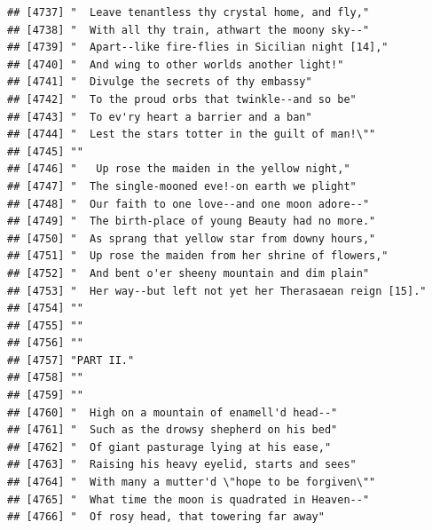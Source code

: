 \documentclass{article}\usepackage[]{graphicx}\usepackage[]{color}
\makeatletter
\newenvironment{kframe}{%
 \def\at@end@of@kframe{}%
 \ifinner\ifhmode%
  \def\at@end@of@kframe{\end{minipage}}%
  \begin{minipage}{\columnwidth}%
 \fi\fi%
 \def\FrameCommand##1{\hskip\@totalleftmargin \hskip-\fboxsep
 \colorbox{shadecolor}{##1}\hskip-\fboxsep
     \hskip-\linewidth \hskip-\@totalleftmargin \hskip\columnwidth}%
 \MakeFramed {\advance\hsize-\width
   \@totalleftmargin\z@ \linewidth\hsize
   \@setminipage}}%
 {\par\unskip\endMakeFramed%
 \at@end@of@kframe}
\newenvironment{knitrout}{}{} %
\makeatother
\begin{document}
\begin{knitrout}
\begin{kframe}
\begin{verbatim}
## [4737] "  Leave tenantless thy crystal home, and fly,"                               
## [4738] "  With all thy train, athwart the moony sky--"                               
## [4739] "  Apart--like fire-flies in Sicilian night [14],"                            
## [4740] "  And wing to other worlds another light!"                                   
## [4741] "  Divulge the secrets of thy embassy"                                        
## [4742] "  To the proud orbs that twinkle--and so be"                                 
## [4743] "  To ev'ry heart a barrier and a ban"                                        
## [4744] "  Lest the stars totter in the guilt of man!\""                              
## [4745] ""                                                                            
## [4746] "   Up rose the maiden in the yellow night,"                                  
## [4747] "  The single-mooned eve!-on earth we plight"                                 
## [4748] "  Our faith to one love--and one moon adore--"                               
## [4749] "  The birth-place of young Beauty had no more."                              
## [4750] "  As sprang that yellow star from downy hours,"                              
## [4751] "  Up rose the maiden from her shrine of flowers,"                            
## [4752] "  And bent o'er sheeny mountain and dim plain"                               
## [4753] "  Her way--but left not yet her Therasaean reign [15]."                      
## [4754] ""                                                                            
## [4755] ""                                                                            
## [4756] ""                                                                            
## [4757] "PART II."                                                                    
## [4758] ""                                                                            
## [4759] ""                                                                            
## [4760] "  High on a mountain of enamell'd head--"                                    
## [4761] "  Such as the drowsy shepherd on his bed"                                    
## [4762] "  Of giant pasturage lying at his ease,"                                     
## [4763] "  Raising his heavy eyelid, starts and sees"                                 
## [4764] "  With many a mutter'd \"hope to be forgiven\""                              
## [4765] "  What time the moon is quadrated in Heaven--"                               
## [4766] "  Of rosy head, that towering far away"                                      

\end{verbatim}
\end{kframe}
\end{knitrout}
\end{document}
